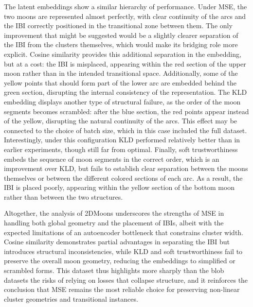 The latent embeddings show a similar hierarchy of performance. Under MSE, the two moons are represented almost perfectly, with clear continuity of the arcs and the IBI correctly positioned in the transitional zone between them. The only improvement that might be suggested would be a slightly clearer separation of the IBI from the clusters themselves, which would make its bridging role more explicit. Cosine similarity provides this additional separation in the embedding, but at a cost: the IBI is misplaced, appearing within the red section of the upper moon rather than in the intended transitional space. Additionally, some of the yellow points that should form part of the lower arc are embedded behind the green section, disrupting the internal consistency of the representation. The KLD embedding displays another type of structural failure, as the order of the moon segments becomes scrambled: after the blue section, the red points appear instead of the yellow, disrupting the natural continuity of the arcs. This effect may be connected to the choice of batch size, which in this case included the full dataset. Interestingly, under this configuration KLD performed relatively better than in earlier experiments, though still far from optimal. Finally, soft trustworthiness embeds the sequence of moon segments in the correct order, which is an improvement over KLD, but fails to establish clear separation between the moons themselves or between the different colored sections of each arc. As a result, the IBI is placed poorly, appearing within the yellow section of the bottom moon rather than between the two structures.

Altogether, the analysis of 2DMoons underscores the strengths of MSE in handling both global geometry and the placement of IBIs, albeit with the expected limitations of an autoencoder bottleneck that constrains cluster width. Cosine similarity demonstrates partial advantages in separating the IBI but introduces structural inconsistencies, while KLD and soft trustworthiness fail to preserve the overall moon geometry, reducing the embeddings to simplified or scrambled forms. This dataset thus highlights more sharply than the blob datasets the risks of relying on losses that collapse structure, and it reinforces the conclusion that MSE remains the most reliable choice for preserving non-linear cluster geometries and transitional instances.

